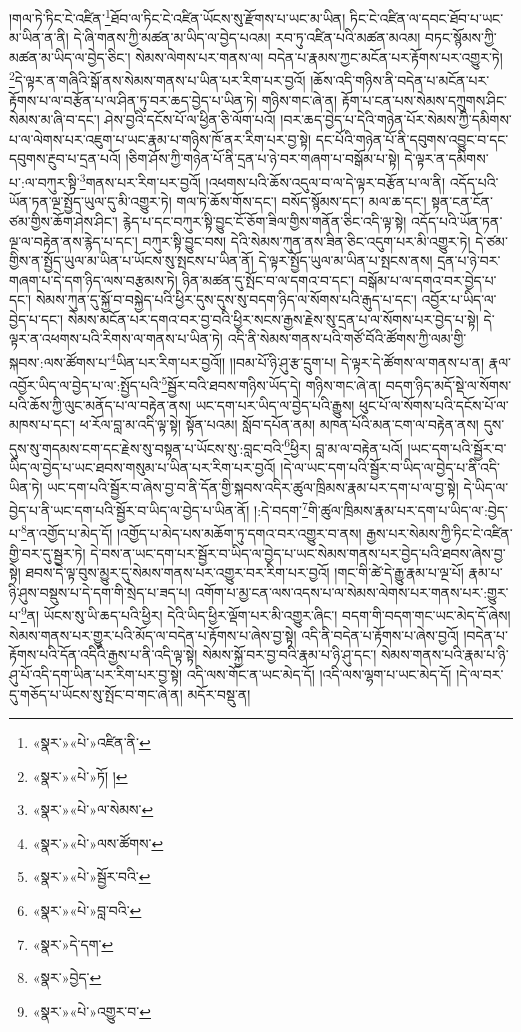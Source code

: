 །གལ་ཏེ་ཏིང་ངེ་འཛིན་\footnote{«སྣར་»«པེ་»འཛིན་ནི་}ཐོབ་ལ་ཏིང་ངེ་འཛིན་ཡོངས་སུ་རྫོགས་པ་ཡང་མ་ཡིན། ཏིང་ངེ་འཛིན་ལ་དབང་ཐོབ་པ་ཡང་མ་ཡིན་ན་ནི། དེ་ཞི་གནས་ཀྱི་མཚན་མ་ཡིད་ལ་བྱེད་པའམ། རབ་ཏུ་འཛིན་པའི་མཚན་མའམ། བཏང་སྙོམས་ཀྱི་མཚན་མ་ཡིད་ལ་བྱེད་ཅིང་། སེམས་ལེགས་པར་གནས་ལ། བདེན་པ་རྣམས་ཀྱང་མངོན་པར་རྟོགས་པར་འགྱུར་ཏེ། \footnote{«སྣར་»«པེ་»ཏོ། ། }དེ་ལྟར་ན་གཞིའི་སྒོ་ནས་སེམས་གནས་པ་ཡིན་པར་རིག་པར་བྱའོ། །ཆོས་འདི་གཉིས་ནི་བདེན་པ་མངོན་པར་རྟོགས་པ་ལ་བརྩོན་པ་ལ་ཤིན་ཏུ་བར་ཆད་བྱེད་པ་ཡིན་ཏེ། གཉིས་གང་ཞེ་ན། རྟོག་པ་ངན་པས་སེམས་དཀྲུགས་ཤིང་སེམས་མ་ཞི་བ་དང་། ཤེས་བྱའི་དངོས་པོ་ལ་ཕྱིན་ཅི་ལོག་པའོ། །བར་ཆད་བྱེད་པ་དེའི་གཉེན་པོར་སེམས་ཀྱི་དམིགས་པ་ལ་ལེགས་པར་འཇུག་པ་ཡང་རྣམ་པ་གཉིས་ཁོ་ནར་རིག་པར་བྱ་སྟེ། དང་པོའི་གཉེན་པོ་ནི་དབུགས་འབྱུང་བ་དང་དབུགས་རྔུབ་པ་དྲན་པའོ། །ཅིག་ཤོས་ཀྱི་གཉེན་པོ་ནི་དྲན་པ་ཉེ་བར་གཞག་པ་བསྒོམ་པ་སྟེ། དེ་ལྟར་ན་དམིགས་པ་:ལ་བཀུར་སྟི་\footnote{«སྣར་»«པེ་»ལ་སེམས་}གནས་པར་རིག་པར་བྱའོ། །འཕགས་པའི་ཆོས་འདུལ་བ་ལ་དེ་ལྟར་བརྩོན་པ་ལ་ནི། འདོད་པའི་ཡོན་ཏན་ལྔ་སྤྱོད་ཡུལ་དུ་མི་འགྱུར་ཏེ། གལ་ཏེ་ཆོས་གོས་དང་། བསོད་སྙོམས་དང་། མལ་ཆ་དང་། སྟན་ངན་ངོན་ཙམ་གྱིས་ཆོག་ཤེས་ཤིང་། རྙེད་པ་དང་བཀུར་སྟི་བྱུང་ངོ་ཅོག་ཟིལ་གྱིས་གནོན་ཅིང་འདི་ལྟ་སྟེ། འདོད་པའི་ཡོན་ཏན་ལྔ་ལ་བརྟེན་ནས་རྙེད་པ་དང་། བཀུར་སྟི་བྱུང་བས། དེའི་སེམས་ཀུན་ནས་ཟིན་ཅིང་འདུག་པར་མི་འགྱུར་ཏེ། དེ་ཙམ་གྱིས་ན་སྤྱོད་ཡུལ་མ་ཡིན་པ་ཡོངས་སུ་སྤངས་པ་ཡིན་ནོ། དེ་ལྟར་སྤྱོད་ཡུལ་མ་ཡིན་པ་སྤངས་ནས། དྲན་པ་ཉེ་བར་གཞག་པ་དེ་དག་ཉིད་ལས་བརྩམས་ཏེ། ཉིན་མཚན་དུ་སྤོང་བ་ལ་དགའ་བ་དང་། བསྒོམ་པ་ལ་དགའ་བར་བྱེད་པ་དང་། སེམས་ཀུན་དུ་སྐྱོ་བ་བསྐྱེད་པའི་ཕྱིར་དུས་དུས་སུ་བདག་ཉིད་ལ་སོགས་པའི་རྒུད་པ་དང་། འབྱོར་པ་ཡིད་ལ་བྱེད་པ་དང་། སེམས་མངོན་པར་དགའ་བར་བྱ་བའི་ཕྱིར་སངས་རྒྱས་རྗེས་སུ་དྲན་པ་ལ་སོགས་པར་བྱེད་པ་སྟེ། དེ་ལྟར་ན་འཕགས་པའི་རིགས་ལ་གནས་པ་ཡིན་ཏེ། འདི་ནི་སེམས་གནས་པའི་གཙོ་བོའི་ཚོགས་ཀྱི་ལམ་གྱི་སྐབས་:ལས་ཚོགས་པ་\footnote{«སྣར་»«པེ་»ལས་ཚོགས་}ཡིན་པར་རིག་པར་བྱའོ།། །།བམ་པོ་ཉི་ཤུ་རྩ་དྲུག་པ། དེ་ལྟར་དེ་ཚོགས་ལ་གནས་པ་ན། རྣལ་འབྱོར་ཡིད་ལ་བྱེད་པ་ལ་:སྤྱོད་པའི་\footnote{«སྣར་»«པེ་»སྦྱོར་བའི་}སྦྱོར་བའི་ཐབས་གཉིས་ཡོད་དེ། གཉིས་གང་ཞེ་ན། བདག་ཉིད་མདོ་སྡེ་ལ་སོགས་པའི་ཆོས་ཀྱི་ལུང་མནོད་པ་ལ་བརྟེན་ནས། ཡང་དག་པར་ཡིད་ལ་བྱེད་པའི་རྒྱུས། ཕུང་པོ་ལ་སོགས་པའི་དངོས་པོ་ལ་མཁས་པ་དང་། ཕ་རོལ་བླ་མ་འདི་ལྟ་སྟེ། སྟོན་པའམ། སློབ་དཔོན་ནམ། མཁན་པོའི་མན་ངག་ལ་བརྟེན་ནས། དུས་དུས་སུ་གདམས་ངག་དང་རྗེས་སུ་བསྟན་པ་ཡོངས་སུ་:བླང་བའི་\footnote{«སྣར་»«པེ་»བླ་བའི་}ཕྱིར། བླ་མ་ལ་བརྟེན་པའོ། །ཡང་དག་པའི་སྦྱོར་བ་ཡིད་ལ་བྱེད་པ་ཡང་ཐབས་གསུམ་པ་ཡིན་པར་རིག་པར་བྱའོ། །དེ་ལ་ཡང་དག་པའི་སྦྱོར་བ་ཡིད་ལ་བྱེད་པ་ནི་འདི་ཡིན་ཏེ། ཡང་དག་པའི་སྦྱོར་བ་ཞེས་བྱ་བ་ནི་དོན་གྱི་སྐབས་འདིར་ཚུལ་ཁྲིམས་རྣམ་པར་དག་པ་ལ་བྱ་སྟེ། དེ་ཡིད་ལ་བྱེད་པ་ནི་ཡང་དག་པའི་སྦྱོར་བ་ཡིད་ལ་བྱེད་པ་ཡིན་ནོ། །:དེ་བདག་\footnote{«སྣར་»དེ་དག་}གི་ཚུལ་ཁྲིམས་རྣམ་པར་དག་པ་ཡིད་ལ་:བྱེད་པ་\footnote{«སྣར་»བྱེད་}ན་འགྱོད་པ་མེད་དོ། །འགྱོད་པ་མེད་པས་མཆོག་ཏུ་དགའ་བར་འགྱུར་བ་ནས། རྒྱས་པར་སེམས་ཀྱི་ཏིང་ངེ་འཛིན་གྱི་བར་དུ་སྦྱར་ཏེ། དེ་བས་ན་ཡང་དག་པར་སྦྱོར་བ་ཡིད་ལ་བྱེད་པ་ཡང་སེམས་གནས་པར་བྱེད་པའི་ཐབས་ཞེས་བྱ་སྟེ། ཐབས་དེ་ལྟ་བུས་མྱུར་དུ་སེམས་གནས་པར་འགྱུར་བར་རིག་པར་བྱའོ། །གང་གི་ཚེ་དེ་རྒྱུ་རྣམ་པ་ལྔ་པོ། རྣམ་པ་ཉི་ཤུས་བསྡུས་པ་དེ་དག་གི་སྲེད་པ་ཟད་པ། འགོག་པ་མྱ་ངན་ལས་འདས་པ་ལ་སེམས་ལེགས་པར་གནས་པར་:གྱུར་པ་\footnote{«སྣར་»«པེ་»འགྱུར་བ་}ན། ཡོངས་སུ་ཡི་ཆད་པའི་ཕྱིར། དེའི་ཡིད་ཕྱིར་ལྡོག་པར་མི་འགྱུར་ཞིང་། བདག་གི་བདག་གང་ཡང་མེད་དོ་ཞེས། སེམས་གནས་པར་གྱུར་པའི་མོད་ལ་བདེན་པ་རྟོགས་པ་ཞེས་བྱ་སྟེ། འདི་ནི་བདེན་པ་རྟོགས་པ་ཞེས་བྱའོ། །བདེན་པ་རྟོགས་པའི་དོན་འདིའི་རྒྱས་པ་ནི་འདི་ལྟ་སྟེ། སེམས་སྐྱོ་བར་བྱ་བའི་རྣམ་པ་ཉི་ཤུ་དང་། སེམས་གནས་པའི་རྣམ་པ་ཉི་ཤུ་པོ་འདི་དག་ཡིན་པར་རིག་པར་བྱ་སྟེ། འདི་ལས་གོང་ན་ཡང་མེད་དོ། །འདི་ལས་ལྷག་པ་ཡང་མེད་དོ། །དེ་ལ་བར་དུ་གཅོད་པ་ཡོངས་སུ་སྤོང་བ་གང་ཞེ་ན། མདོར་བསྡུ་ན། 